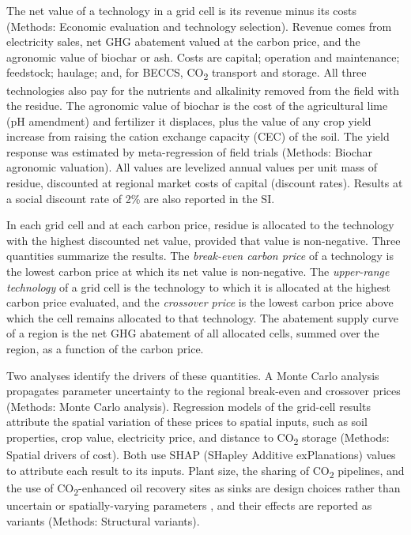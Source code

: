 \documentclass[
  letterpaper,
  twoside,
  twocolumn,
  9pt]{article}
\begin{document}
The net value of a technology in a grid cell is its revenue minus its
costs (Methods: Economic evaluation and technology selection). Revenue
comes from electricity sales, net GHG abatement valued at the carbon
price, and the agronomic value of biochar or ash. Costs are capital;
operation and maintenance; feedstock; haulage; and, for BECCS,
CO\textsubscript{2} transport and storage. All three technologies also
pay for the nutrients and alkalinity removed from the field with the
residue. The agronomic value of biochar is the cost of the agricultural
lime (pH amendment) and fertilizer it displaces, plus the value of any
crop yield increase from raising the cation exchange capacity (CEC) of
the soil. The yield response was estimated by meta-regression of field
trials (Methods: Biochar agronomic valuation). All values are levelized
annual values per unit mass of residue, discounted at regional market
costs of capital (discount rates). Results at a social discount rate of
2\% are also reported in the SI.

In each grid cell and at each carbon price, residue is allocated to the
technology with the highest discounted net value, provided that value is
non-negative. Three quantities summarize the results. The
\emph{break-even carbon price} of a technology is the lowest carbon
price at which its net value is non-negative. The \emph{upper-range
technology} of a grid cell is the technology to which it is allocated at
the highest carbon price evaluated, and the \emph{crossover price} is
the lowest carbon price above which the cell remains allocated to that
technology. The abatement supply curve of a region is the net GHG
abatement of all allocated cells, summed over the region, as a function
of the carbon price.

Two analyses identify the drivers of these quantities. A Monte Carlo
analysis propagates parameter uncertainty to the regional break-even and
crossover prices (Methods: Monte Carlo analysis). Regression models of
the grid-cell results attribute the spatial variation of these prices to
spatial inputs, such as soil properties, crop value, electricity price,
and distance to CO\textsubscript{2} storage (Methods: Spatial drivers of
cost). Both use SHAP (SHapley Additive exPlanations) values to attribute
each result to its inputs. Plant size, the sharing of
CO\textsubscript{2} pipelines, and the use of
CO\textsubscript{2}-enhanced oil recovery sites as sinks are design
choices rather than uncertain or spatially-varying parameters , and
their effects are reported as variants (Methods: Structural variants).
\end{document}
